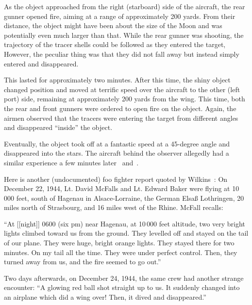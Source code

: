 As the object approached from the right (starboard) side of the aircraft, the rear gunner opened fire,
aiming at a range of approximately 200 yards.
From their distance, the object might have been about the size of the Moon and was potentially even much larger than that.
While the rear gunner was shooting, the trajectory of the tracer shells could be followed as they entered the target,
However, the peculiar thing was that they did not fall away but instead simply entered and disappeared.

This lasted for approximately two minutes. After this time, the shiny object changed position and moved at terrific speed over the aircraft to the
other (left port) side,
remaining at approximately 200 yards from the wing.
This time, both the rear and front gunners were ordered to open fire on the object.
Again, the airmen observed that the tracers were entering the target from different angles and disappeared ``inside'' the object.

Eventually, the object took off at a fantastic
speed at a 45-degree angle and disappeared into the stars.
The aircraft behind the observer allegedly had a similar experience a few minutes later~\cite[Chapter~3,note~64]{Chester2007May} and~\cite{MUFONUFOJ-290}.


Here is another (undocumented) foo fighter report quoted by Wilkins~\cite[Chapter~II]{Wilkins1954Jan}:
On December 22, 1944, Lt. David McFalls and Lt. Edward Baker were flying at 10\,000 feet,
south of Hagenau in Alsace-Lorraine, the German Elsa{\ss} Lothringen, 20 miles north of Strasbourg, and 16 miles west of the Rhine.
McFall recalls:
\begin{svgraybox}
``At [[night]] 0600 (six pm) near Hagenau, at 10\,000 feet altitude, two very bright lights climbed toward
us from the ground. They levelled off and stayed on the tail of our plane. They were huge,
bright orange lights. They stayed there for two minutes. On my tail all the time. They were
under perfect control. Then, they turned away from us, and the fire seemed to go out.''
\end{svgraybox}
Two days afterwards, on December 24, 1944, the same crew had another strange encounter:
``A glowing red ball shot straight up to us. It suddenly changed into an airplane which did a wing over! Then, it dived and disappeared.''

